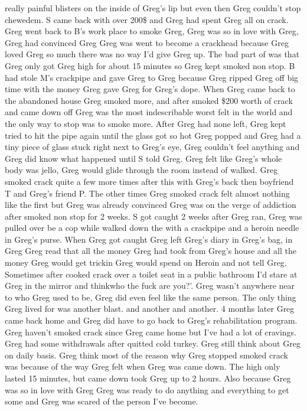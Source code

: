 \documentclass[12pt]{book}
\begin{document}
really painful blisters on the inside of Greg's lip but even then Greg couldn't stop chewedem. S came back with over 200\$ and Greg had spent Greg all on crack. Greg went back to B's work place to smoke Greg, Greg was so in love with Greg, Greg had convinced Greg Greg was went to become a crackhead because Greg loved Greg so much there was no way I'd give Greg up. The bad part of was that Greg only got Greg high for about 15 minutes so Greg kept smoked non stop. B had stole M's crackpipe and gave Greg to Greg because Greg ripped Greg off big time with the money Greg gave Greg for Greg's dope. When Greg came back to the abandoned house Greg smoked more, and after smoked \$200 worth of crack and came down off Greg was the most indescribable worst felt in the world and the only way to stop was to smoke more. After Greg had none left, Greg kept tried to hit the pipe again until the glass got so hot Greg popped and Greg had a tiny piece of glass stuck right next to Greg's eye, Greg couldn't feel anything and Greg did know what happened until S told Greg. Greg felt like Greg's whole body was jello, Greg would glide through the room instead of walked. Greg smoked crack quite a few more times after this with Greg's back then boyfriend T and Greg's friend P. The other times Greg smoked crack felt almost nothing like the first but Greg was already convinced Greg was on the verge of addiction after smoked non stop for 2 weeks. S got caught 2 weeks after Greg ran, Greg was pulled over be a cop while walked down the with a crackpipe and a heroin needle in Greg's purse. When Greg got caught Greg left Greg's diary in Greg's bag, in Greg Greg read that all the money Greg had took from Greg's house and all the money Greg would get trickin Greg would spend on Heroin and not tell Greg. Sometimes after cooked crack over a toilet seat in a public bathroom I'd stare at Greg in the mirror and thinkwho the fuck are you?'. Greg wasn't anywhere near to who Greg used to be, Greg did even feel like the same person. The only thing Greg lived for was another blast. and another and another. 4 months later Greg came back home and Greg did have to go back to Greg's rehabilitation program. Greg haven't smoked crack since Greg came home but I've had a lot of cravings. Greg had some withdrawals after quitted cold turkey. Greg still think about Greg on daily basis. Greg think most of the reason why Greg stopped smoked crack was because of the way Greg felt when Greg was came down. The high only lasted 15 minutes, but came down took Greg up to 2 hours. Also because Greg was so in love with Greg Greg was ready to do anything and everything to get some and Greg was scared of the person I've become.
\end{document}
